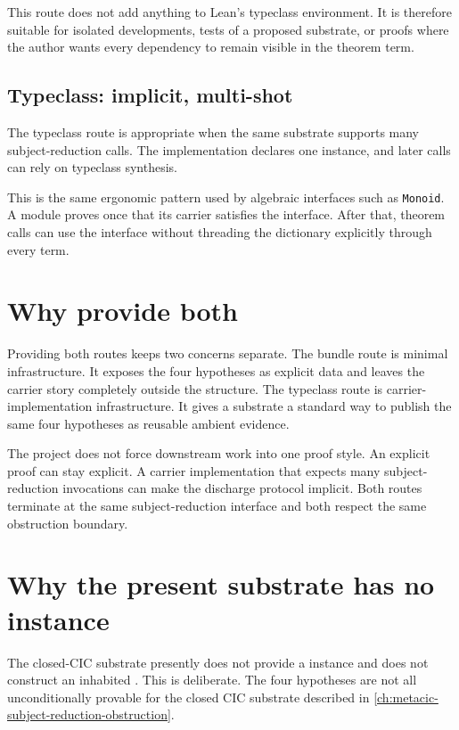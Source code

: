 This route does not add anything to Lean's typeclass environment.
It is therefore suitable for isolated developments, tests of a proposed
substrate, or proofs where the author wants every dependency to remain
visible in the theorem term.

\subsection{Typeclass: implicit, multi-shot}
\label{subsec:sr-discharge-routes-typeclass-multi-shot}

The typeclass route is appropriate when the same substrate supports many
subject-reduction calls.
The implementation declares one
instance, and later calls can rely on typeclass synthesis.

This is the same ergonomic pattern used by algebraic interfaces such as
\texttt{Monoid}.
A module proves once that its carrier satisfies the interface.
After that, theorem calls can use the interface without threading the
dictionary explicitly through every term.

\section{Why provide both}
\label{sec:sr-discharge-routes-why-both}

Providing both routes keeps two concerns separate.
The bundle route is minimal infrastructure.
It exposes the four hypotheses as explicit data and leaves the carrier
story completely outside the structure.
The typeclass route is carrier-implementation infrastructure.
It gives a substrate a standard way to publish the same four hypotheses
as reusable ambient evidence.

The project does not force downstream work into one proof style.
An explicit proof can stay explicit.
A carrier implementation that expects many subject-reduction invocations
can make the discharge protocol implicit.
Both routes terminate at the same subject-reduction interface and both
respect the same obstruction boundary.

\section{Why the present substrate has no instance}
\label{sec:sr-discharge-routes-no-present-instance}

The closed-CIC substrate presently does not provide a
instance and does not construct an inhabited
.
This is deliberate.
The four hypotheses are not all unconditionally provable for the closed
CIC substrate described in
\autoref{ch:metacic-subject-reduction-obstruction}.

